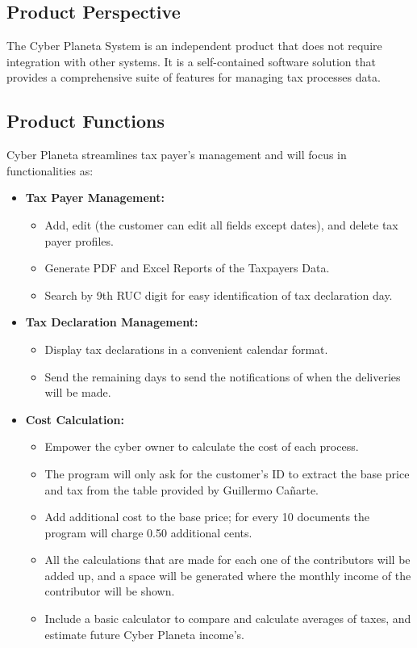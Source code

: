 \documentclass[12pt,a4paper, twosite]{article}
\begin{document}
\subsection{Product Perspective}
\label{sec:org24980a8}

The Cyber Planeta System is an independent product that does not require integration with other systems. It is a self-contained software solution that provides a comprehensive suite of features for managing tax processes data.


\subsection{Product Functions}
\label{sec:orgaf51da6}

Cyber Planeta streamlines tax payer's management and will focus in functionalities as: \begin{itemize}
\item \textbf{Tax Payer Management:}
\begin{itemize}
\item Add, edit (the customer can edit all fields except dates), and delete tax payer profiles.
\item Generate PDF and Excel Reports of the Taxpayers Data.
\item Search by 9th RUC digit for easy identification of tax declaration day.
\end{itemize}
\item \textbf{Tax Declaration Management:}
\begin{itemize}
\item Display tax declarations in a convenient calendar format.
\item Send the remaining days to send the notifications of when the deliveries will be made. 
\end{itemize}
\item \textbf{Cost Calculation:}
\begin{itemize}
\item Empower the cyber owner to calculate the cost of each process.
\item The program will only ask for the customer's ID to extract the base price and tax from the table provided by Guillermo Cañarte.
\item Add additional cost to the base price; for every 10 documents the program will charge 0.50 additional cents.
\item All the calculations that are made for each one of the contributors will be added up, and a space will be generated where the monthly income of the contributor will be shown.
\item Include a basic calculator to compare and calculate averages of taxes, and estimate future Cyber Planeta income's.


\end{itemize}
\end{itemize}
\end{document}
